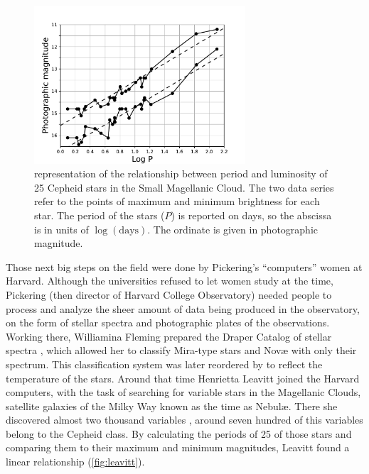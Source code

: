 \begin{figure}
	\centering
	\includegraphics[width=0.7\textwidth]{img/leavitt.pdf}
	\caption[Leavitt PL relation]{\cite{Leavitt1912} representation of the relationship between period and luminosity 
	of 25 Cepheid stars in the Small Magellanic Cloud.
	The two data series refer to the points of maximum and minimum brightness for each star. 
	The period of the stars ($P$) is reported on days, so the abscissa is in units of $\log(\text{days})$.
	The ordinate is given in photographic magnitude.
	}
	\label{fig:leavitt}
\end{figure}

Those next big steps on the field were done by Pickering's ``computers'' women at Harvard. 
Although the universities refused to let women study at the time, Pickering (then director of Harvard College Observatory) 
needed people to process and analyze the sheer amount of data being produced in the observatory, 
on the form of stellar spectra and photographic plates of the observations.
Working there, Williamina Fleming prepared the Draper Catalog of stellar spectra \citep{Pickering1890,Maury1897}, 
which allowed her to classify Mira-type stars and Nov\ae{} with only their spectrum. 
This classification system was later reordered by \cite{Canon1901} to reflect the temperature of the stars.
Around that time Henrietta Leavitt joined the Harvard computers, 
with the task of searching for variable stars in the Magellanic Clouds, satellite galaxies of the Milky Way known as the time as Nebul\ae{}.
There she discovered almost two thousand variables \citep{Leavitt1908}, around seven hundred of this variables belong to the Cepheid class. 
By calculating the periods of 25 of those stars and comparing them to their maximum and minimum magnitudes, Leavitt found a linear relationship (\autoref{fig:leavitt}).


